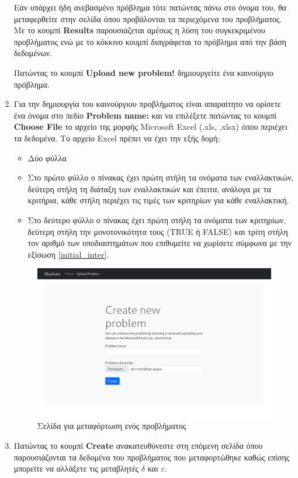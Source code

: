 \documentclass[11pt,a4paper,titlepage]{article}
\numberwithin{equation}{section}
\begin{document}
\begin{enumerate}
	Εάν υπάρχει ήδη ανεβασμένο πρόβλημα τότε πατώντας πάνω στο όνομα του, θα μεταφερθείτε στην σελίδα όπου προβάλονται τα περιεχόμενα του προβλήματος. Με το κουμπί \textbf{Results} παρουσιάζεται αμέσως η λύση του συγκεκριμένου προβλήματος ενώ με το κόκκινο κουμπί διαγράφεται το πρόβλημα από την βάση δεδομένων.
	
	Πατώντας το κουμπί \textbf{Upload new problem!} δημιουργείτε ένα καινούργιο πρόβλημα.
	
	\item Για την δημιουργία του καινούργιου προβλήματος είναι απαραίτητο να ορίσετε ένα όνομα στο πεδίο \textbf{Problem name:} και να επιλέξετε πατώντας το κουμπί \textbf{Choose File} το αρχείο της μορφής Microsoft Excel (.xls, .xlsx) όπου περιέχει τα δεδομένα. Το αρχείο Excel πρέπει να έχει την εξής δομή:
	
	\begin{itemize}
		\item Δύο φύλλα 
		\item Στο πρώτο φύλλο ο πίνακας έχει πρώτη στήλη τα ονόματα των εναλλακτικών, δεύτερη στήλη τη διάταξη των εναλλακτικών και έπειτα, ανάλογα με τα κριτήρια, κάθε στήλη περιέχει τις τιμές των κριτηρίων για κάθε εναλλακτική.
		\item Στο δεύτερο φύλλο ο πίνακας έχει πρώτη στήλη τα ονόματα των κριτηρίων, δεύτερη στήλη την μονοτονικότητα τους (TRUE ή FALSE) και τρίτη στήλη τον αριθμό των υποδιαστημάτων που επιθυμείτε να χωρίσετε σύμφωνα με την εξίσωση \ref{initial_inter}.
	\end{itemize}
	
	\begin{figure}[H]
		\centering
		\includegraphics[width=0.8\linewidth]{media/upload.png}
		\caption{Σελίδα για μεταφόρτωση ενός προβλήματος}
		\label{fig:uplaod}
	\end{figure}
	
	\item Πατώντας το κουμπί \textbf{Create} ανακατευθύνεστε στη επόμενη σελίδα όπου παρουσιάζονται τα δεδομένα του προβλήματος που μεταφορτώθηκε καθώς επίσης μπορείτε να αλλάξετε τις μεταβλητές $δ$ και $ε$.
	

\end{enumerate}
\end{document}
